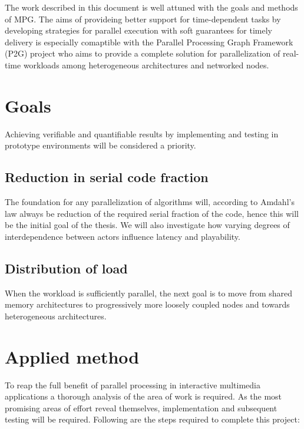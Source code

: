 \documentclass{article}
\begin{document}
The work described in this document is well attuned with the goals and
methods of MPG. The aims of provideing better support for
time-dependent tasks by developing strategies for parallel execution
with soft guarantees for timely delivery is especially comaptible with
the Parallel Processing Graph Framework (P2G) project who aims to
provide a complete solution for parallelization of real-time workloads
among heterogeneous architectures and networked nodes.


\section{Goals}
Achieving verifiable and quantifiable results by implementing and testing in prototype environments will be considered a priority. 

\subsection{Reduction in serial code fraction}
The foundation for any parallelization of algorithms will, according to
Amdahl's law always be reduction of the required serial fraction of
the code, hence this will be the initial goal of the thesis. We will also investigate how varying degrees of interdependence between actors influence latency and playability.

\subsection{Distribution of load}
When the workload is sufficiently parallel, the next goal is to move
from shared memory architectures to progressively more loosely coupled
nodes and towards heterogeneous architectures. 

\section{Applied method}
To reap the full benefit of parallel processing in interactive multimedia
applications a thorough analysis of the area of work is required. As
the most promising areas of effort reveal themselves, implementation
and subsequent testing will be required.  Following are the steps
required to complete this project:
\end{document}
